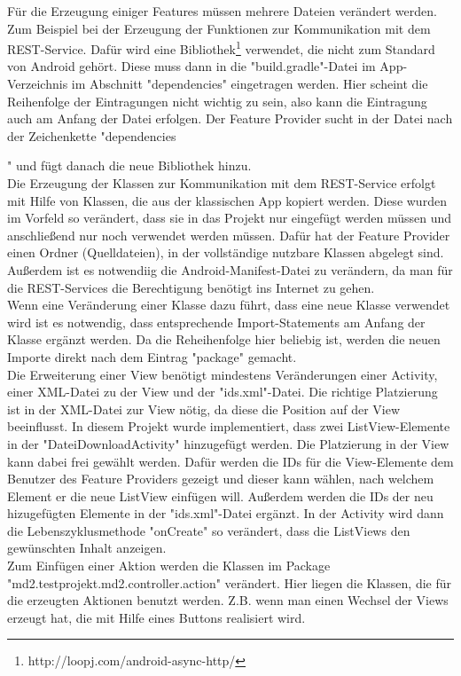 \documentclass[a4paper,twoside]{article}
\begin{document}
	\noindent F\"ur die Erzeugung einiger Features m\"ussen mehrere Dateien ver\"andert werden. Zum Beispiel bei der Erzeugung der Funktionen zur Kommunikation mit dem REST-Service. Daf\"ur wird eine Bibliothek\footnote{http://loopj.com/android-async-http/} verwendet, die nicht zum Standard von Android geh\"ort. Diese muss dann in die "build.gradle"-Datei im App-Verzeichnis im Abschnitt "dependencies" eingetragen werden. Hier scheint die Reihenfolge der Eintragungen nicht wichtig zu sein, also kann die Eintragung auch am Anfang der Datei erfolgen. Der Feature Provider sucht in der Datei nach der Zeichenkette "dependencies{" und f\"ugt danach die neue Bibliothek hinzu.\\
		Die Erzeugung der Klassen zur Kommunikation mit dem REST-Service erfolgt mit Hilfe von Klassen, die aus der klassischen App kopiert werden. Diese wurden im Vorfeld so ver\"andert, dass sie in das Projekt nur eingef\"ugt werden m\"ussen und anschlie\ss{}end nur noch verwendet werden m\"ussen. Daf\"ur hat der Feature Provider einen Ordner (Quelldateien), in der vollst\"andige nutzbare Klassen abgelegt sind.\\
		Au\ss{}erdem ist es notwendiig die Android-Manifest-Datei zu ver\"andern, da man f\"ur die REST-Services die Berechtigung ben\"otigt ins Internet zu gehen.\\
		Wenn eine Ver\"anderung einer Klasse dazu f\"uhrt, dass eine neue Klasse verwendet wird ist es notwendig, dass entsprechende Import-Statements am Anfang der Klasse erg\"anzt werden. Da die Reheihenfolge hier beliebig ist, werden die neuen Importe direkt nach dem Eintrag "package" gemacht.\\
		Die Erweiterung einer View ben\"otigt mindestens Ver\"anderungen einer Activity, einer XML-Datei zu der View und der "ids.xml"-Datei. Die richtige Platzierung ist in der XML-Datei zur View n\"otig, da diese die Position auf der View beeinflusst. In diesem Projekt wurde implementiert, dass zwei ListView-Elemente in der "DateiDownloadActivity" hinzugef\"ugt werden. Die Platzierung in der View kann dabei frei gew\"ahlt werden. Daf\"ur werden die IDs f\"ur die View-Elemente dem Benutzer des Feature Providers gezeigt und dieser kann w\"ahlen, nach welchem Element er die neue ListView einf\"ugen will. Au\ss{}erdem werden die IDs der neu hizugef\"ugten Elemente in der "ids.xml"-Datei erg\"anzt. In der Activity wird dann die Lebenszyklusmethode "onCreate" so ver\"andert, dass die ListViews den gew\"unschten Inhalt anzeigen.\\
		Zum Einf\"ugen einer Aktion werden die Klassen im Package "md2.testprojekt.md2.controller.action" ver\"andert. Hier liegen die Klassen, die f\"ur die erzeugten Aktionen benutzt werden. Z.B. wenn man einen Wechsel der Views erzeugt hat, die mit Hilfe eines Buttons realisiert wird.
		
}
\end{document}
